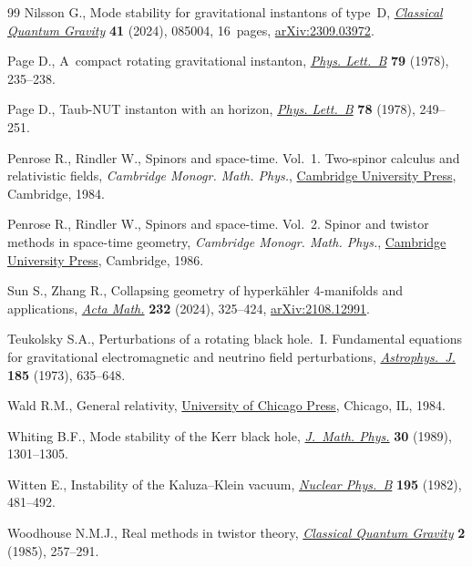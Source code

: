 \documentclass[10pt,a4paper]{amsart}
\numberwithin{equation}{section}
\begin{document}
\begin{thebibliography}{99}
Nilsson G., Mode stability for gravitational instantons of type~{D},
 \href{https://doi.org/10.1088/1361-6382/ad296f}{\textit{Classical Quantum Gravity}} \textbf{41} (2024), 085004, 16~pages,
 \href{https://arxiv.org/abs/2309.03972}{arXiv:2309.03972}.

Page D., A~compact rotating gravitational instanton, \href{https://doi.org/10.1016/0370-2693(78)90231-9}{\textit{Phys. Lett.~B}}
 \textbf{79} (1978), 235--238.

Page D., Taub-{NUT} instanton with an horizon, \href{https://doi.org/10.1016/0370-2693(78)90016-3}{\textit{Phys. Lett.~B}}
 \textbf{78} (1978), 249--251.

Penrose R., Rindler W., Spinors and space-time. {V}ol.~1. {T}wo-spinor calculus
 and relativistic fields, \textit{Cambridge Monogr. Math. Phys.}, \href{https://doi.org/10.1017/CBO9780511564048}{Cambridge University
 Press}, Cambridge, 1984.

Penrose R., Rindler W., Spinors and space-time. {V}ol.~2. Spinor and twistor
 methods in space-time geometry, \textit{Cambridge Monogr. Math. Phys.}, \href{https://doi.org/10.1017/CBO9780511524486}{Cambridge
 University Press}, Cambridge, 1986.

Sun S., Zhang R., Collapsing geometry of hyperk\"ahler 4-manifolds and
 applications, \href{https://doi.org/10.4310/acta.2024.v232.n2.a2}{\textit{Acta Math.}} \textbf{232} (2024), 325--424,
 \href{https://arxiv.org/abs/2108.12991}{arXiv:2108.12991}.

Teukolsky S.A., Perturbations of a rotating black hole.~{I}. Fundamental
 equations for gravitational electromagnetic and neutrino field perturbations,
 \href{https://doi.org/10.1086/152444}{\textit{Astrophys.~J.}} \textbf{185} (1973), 635--648.

Wald R.M., General relativity, \href{https://doi.org/10.7208/chicago/9780226870373.001.0001}{University of Chicago Press}, Chicago, IL, 1984.

Whiting B.F., Mode stability of the {K}err black hole, \href{https://doi.org/10.1063/1.528308}{\textit{J.~Math. Phys.}}
 \textbf{30} (1989), 1301--1305.

Witten E., Instability of the {K}aluza--{K}lein vacuum, \href{https://doi.org/10.1016/0550-3213(82)90007-4}{\textit{Nuclear
 Phys.~B}} \textbf{195} (1982), 481--492.

Woodhouse N.M.J., Real methods in twistor theory, \href{https://doi.org/10.1088/0264-9381/2/3/006}{\textit{Classical Quantum
 Gravity}} \textbf{2} (1985), 257--291.

\end{thebibliography}
\end{document}
